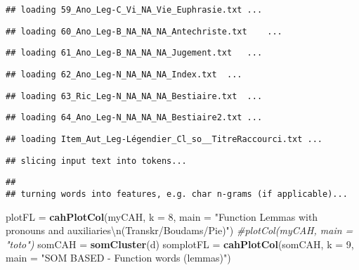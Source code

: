 \documentclass[]{article}
\newenvironment{Shaded}{\begin{snugshade}}{\end{snugshade}}
\newcommand{\CharTok}[1]{\textcolor[rgb]{0.31,0.60,0.02}{#1}}
\newcommand{\CommentTok}[1]{\textcolor[rgb]{0.56,0.35,0.01}{\textit{#1}}}
\newcommand{\DataTypeTok}[1]{\textcolor[rgb]{0.13,0.29,0.53}{#1}}
\newcommand{\DecValTok}[1]{\textcolor[rgb]{0.00,0.00,0.81}{#1}}
\newcommand{\KeywordTok}[1]{\textcolor[rgb]{0.13,0.29,0.53}{\textbf{#1}}}
\newcommand{\NormalTok}[1]{#1}
\newcommand{\StringTok}[1]{\textcolor[rgb]{0.31,0.60,0.02}{#1}}
\begin{document}
\begin{verbatim}
## loading 59_Ano_Leg-C_Vi_NA_Vie_Euphrasie.txt ...
\end{verbatim}

\begin{verbatim}
## loading 60_Ano_Leg-B_NA_NA_NA_Antechriste.txt    ...
\end{verbatim}

\begin{verbatim}
## loading 61_Ano_Leg-B_NA_NA_NA_Jugement.txt   ...
\end{verbatim}

\begin{verbatim}
## loading 62_Ano_Leg-N_NA_NA_NA_Index.txt  ...
\end{verbatim}

\begin{verbatim}
## loading 63_Ric_Leg-N_NA_NA_NA_Bestiaire.txt  ...
\end{verbatim}

\begin{verbatim}
## loading 64_Ano_Leg-N_NA_NA_NA_Bestiaire2.txt ...
\end{verbatim}

\begin{verbatim}
## loading Item_Aut_Leg-Légendier_Cl_so__TitreRaccourci.txt ...
\end{verbatim}

\begin{verbatim}
## slicing input text into tokens...
\end{verbatim}

\begin{verbatim}
## 
## turning words into features, e.g. char n-grams (if applicable)...
\end{verbatim}

\begin{Shaded}
\begin{Highlighting}[]
\NormalTok{plotFL =}\StringTok{ }\KeywordTok{cahPlotCol}\NormalTok{(myCAH, }\DataTypeTok{k =} \DecValTok{8}\NormalTok{, }\DataTypeTok{main =} \StringTok{"Function Lemmas with pronouns and auxiliaries}\CharTok{\textbackslash{}n}\StringTok{(Transkr/Boudams/Pie)"}\NormalTok{)}
\CommentTok{#plotCol(myCAH, main = "toto")}
\NormalTok{somCAH =}\StringTok{ }\KeywordTok{somCluster}\NormalTok{(d)}
\NormalTok{somplotFL =}\StringTok{ }\KeywordTok{cahPlotCol}\NormalTok{(somCAH, }\DataTypeTok{k =} \DecValTok{9}\NormalTok{, }\DataTypeTok{main =} \StringTok{"SOM BASED - Function words (lemmas)"}\NormalTok{)}
\end{Highlighting}
\end{Shaded}
\end{document}
